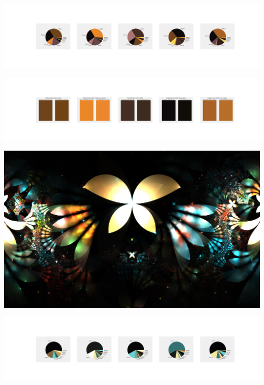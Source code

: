 \documentclass[11pt]{article}
\begin{document}
\begin{landscape}
    \begin{center}
    \includegraphics[width=250mm]{./nbimg/pie-398.jpg}
    \end{center}

    \begin{center}
    \includegraphics[width=250mm]{./nbimg/peak-398.jpg}
    \end{center}
    

    \begin{center}
    \includegraphics[width=\textwidth]{./nbimg/file (52).jpg}
    \end{center}

    \begin{center}
    \includegraphics[width=250mm]{./nbimg/pie-399.jpg}
    \end{center}


\end{landscape}
\end{document}
